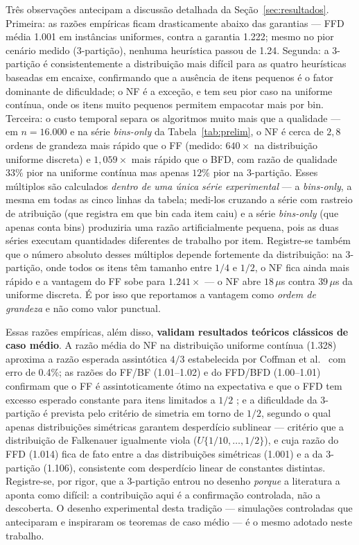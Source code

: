 \documentclass[12pt]{article}
\begin{document}
Três observações antecipam a discussão detalhada da Seção~\ref{sec:resultados}. Primeira: as razões empíricas ficam drasticamente abaixo das garantias --- FFD média 1.001 em instâncias uniformes, contra a garantia 1.222; mesmo no pior cenário medido (3-partição), nenhuma heurística passou de 1.24. Segunda: a 3-partição é consistentemente a distribuição mais difícil para as quatro heurísticas baseadas em encaixe, confirmando que a ausência de itens pequenos é o fator dominante de dificuldade; o NF é a exceção, e tem seu pior caso na uniforme contínua, onde os itens muito pequenos permitem empacotar mais por bin. Terceira: o custo temporal separa os algoritmos muito mais que a qualidade --- em $n=16.000$ e na série \textit{bins-only} da Tabela~\ref{tab:prelim}, o NF é cerca de $2{,}8$ ordens de grandeza mais rápido que o FF (medido: $640\times$ na distribuição uniforme discreta) e $1{,}059\times$ mais rápido que o BFD, com razão de qualidade $33\%$ pior na uniforme contínua mas apenas $12\%$ pior na 3-partição. Esses múltiplos são calculados \emph{dentro de uma única série experimental} --- a \textit{bins-only}, a mesma em todas as cinco linhas da tabela; medi-los cruzando a série com rastreio de atribuição (que registra em que bin cada item caiu) e a série \textit{bins-only} (que apenas conta bins) produziria uma razão artificialmente pequena, pois as duas séries executam quantidades diferentes de trabalho por item. Registre-se também que o número absoluto desses múltiplos depende fortemente da distribuição: na 3-partição, onde todos os itens têm tamanho entre $1/4$ e $1/2$, o NF fica ainda mais rápido e a vantagem do FF sobe para $1.241\times$ --- o NF abre $18\,\mu$s contra $39\,\mu$s da uniforme discreta. É por isso que reportamos a vantagem como \emph{ordem de grandeza} e não como valor punctual.

Essas razões empíricas, além disso, \textbf{validam resultados teóricos clássicos de caso médio}. A razão média do NF na distribuição uniforme contínua (1.328) aproxima a razão esperada assintótica $4/3$ estabelecida por Coffman et al.~\cite{coffman1980} com erro de 0.4\%; as razões do FF/BF (1.01--1.02) e do FFD/BFD (1.00--1.01) confirmam que o FF é assintoticamente ótimo na expectativa e que o FFD tem excesso esperado constante para itens limitados a $1/2$ \cite{bentley1984}; e a dificuldade da 3-partição é prevista pelo critério de simetria em torno de $1/2$, segundo o qual apenas distribuições simétricas garantem desperdício sublinear \cite{bentley1984} --- critério que a distribuição de Falkenauer igualmente viola ($U\{1/10,\ldots,1/2\}$), e cuja razão do FFD (1.014) fica de fato entre a das distribuições simétricas (1.001) e a da 3-partição (1.106), consistente com desperdício linear de constantes distintas. Registre-se, por rigor, que a 3-partição entrou no desenho \emph{porque} a literatura a aponta como difícil: a contribuição aqui é a confirmação controlada, não a descoberta. O desenho experimental desta tradição --- simulações controladas que anteciparam e inspiraram os teoremas de caso médio \cite{bentley1983} --- é o mesmo adotado neste trabalho.
\end{document}
